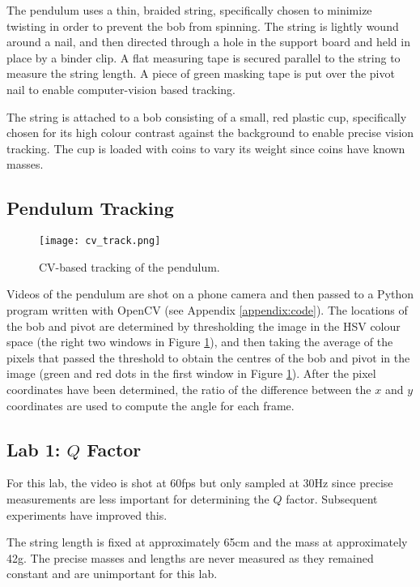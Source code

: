 \documentclass[aps,twocolumn,secnumarabic,nobalancelastpage,amsmath,amssymb,nofootinbib,floatfix,letterpaper]{revtex4}
\begin{document}
The pendulum uses a thin, braided string, specifically chosen to minimize twisting in order to prevent the bob from
spinning. The string is lightly wound around a nail, and then directed through a hole in the support board and held
in place by a binder clip. A flat measuring tape is secured parallel to the string to measure the string length. A
piece of green masking tape is put over the pivot nail to enable computer-vision based tracking.

The string is attached to a bob consisting of a small, red plastic cup, specifically chosen for its high colour contrast
against the background to enable precise vision tracking. The cup is loaded with coins to vary its weight since coins
have known masses.

\subsection{Pendulum Tracking}
\label{sec:tracking}

\begin{figure}[htb]
    \texttt{[image: cv\_track.png]}
    \caption{CV-based tracking of the pendulum.}
    \label{fig:tracking}
\end{figure}

Videos of the pendulum are shot on a phone camera and then passed to a Python program written with OpenCV (see Appendix
\ref{appendix:code}). The locations of the bob and pivot are determined by thresholding the image in the HSV colour
space (the right two windows in Figure \ref{fig:tracking}), and then taking the average of the pixels that passed the
threshold to obtain the centres of the bob and pivot in the image (green and red dots in the first window in Figure
\ref{fig:tracking}). After the pixel coordinates have been determined, the ratio of the difference between the \(x\) and
\(y\) coordinates are used to compute the angle for each frame.

\subsection{Lab 1: \texorpdfstring{\(Q\)}{Q} Factor}
\label{sec:lab1_method}

For this lab, the video is shot at 60fps but only sampled at 30Hz since precise measurements are less important for
determining the \(Q\) factor. Subsequent experiments have improved this.

The string length is fixed at approximately 65cm and the mass at approximately 42g. The precise masses and lengths are
never measured as they remained constant and are unimportant for this lab.
\end{document}
